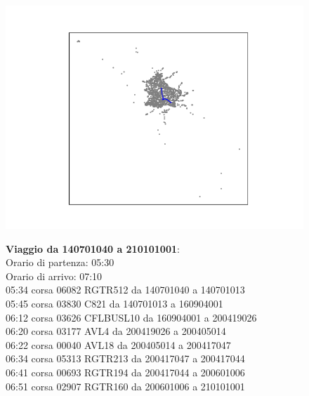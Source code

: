 \documentclass{article}
\begin{document}
\begin{figure}[H]
	\begin{minipage}{0.55\linewidth}
		\centering
		\hspace*{-3cm}\includegraphics[width=1.0\linewidth, valign=t]{figures/140701040_210101001}
	\end{minipage}
	\hspace*{-2cm}\begin{minipage}{0.7\linewidth}
		\textbf{Viaggio da 140701040 a 210101001}:\\
		Orario di partenza: 05:30\\
		Orario di arrivo: 07:10\\
		05:34 corsa 06082 RGTR512 da 140701040 a 140701013\\
		05:45 corsa 03830 C821 da 140701013 a 160904001\\
		06:12 corsa 03626 CFLBUSL10 da 160904001 a 200419026\\
		06:20 corsa 03177 AVL4 da 200419026 a 200405014\\
		06:22 corsa 00040 AVL18 da 200405014 a 200417047\\
		06:34 corsa 05313 RGTR213 da 200417047 a 200417044\\
		06:41 corsa 00693 RGTR194 da 200417044 a 200601006\\
		06:51 corsa 02907 RGTR160 da 200601006 a 210101001
		
			\end{minipage}
\end{figure}
\end{document}
